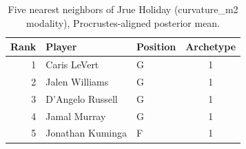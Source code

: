 \begin{table}[htbp]
  \centering\small
  \begin{tabular}{rllc}
    \toprule
    Rank & Player & Position & Archetype \\
    \midrule
    1 & Caris LeVert & G & 1 \\
    2 & Jalen Williams & G & 1 \\
    3 & D'Angelo Russell & G & 1 \\
    4 & Jamal Murray & G & 1 \\
    5 & Jonathan Kuminga & F & 1 \\
    \bottomrule
  \end{tabular}
  \caption{Five nearest neighbors of Jrue Holiday (curvature_m2 modality), Procrustes-aligned posterior mean.}
  \label{tab:Jrue_Holiday_neighbors_curvature_m2}
\end{table}

